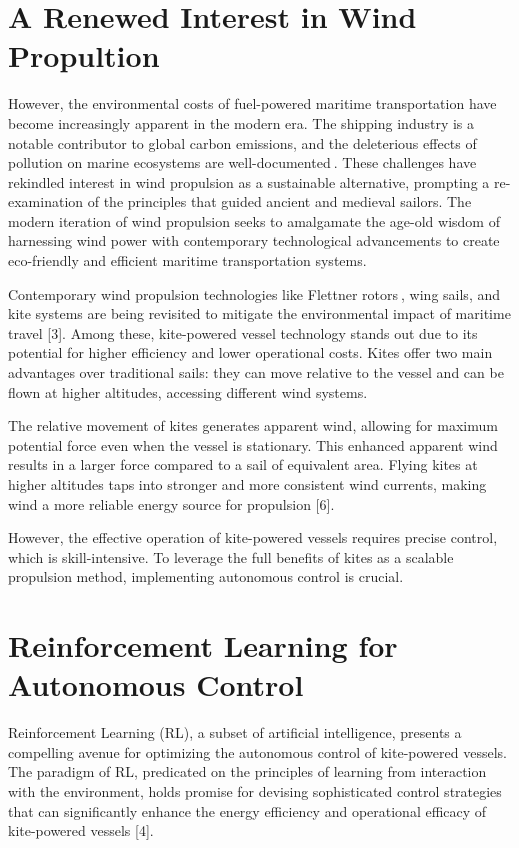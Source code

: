 \section{A Renewed Interest in Wind Propultion}
However, the environmental costs of fuel-powered maritime transportation have become increasingly apparent in the modern era. The shipping industry is a notable contributor to global carbon emissions, and the deleterious effects of pollution on marine ecosystems are well-documented$~$\cite{corbett2007mortality}. These challenges have rekindled interest in wind propulsion as a sustainable alternative, prompting a re-examination of the principles that guided ancient and medieval sailors. The modern iteration of wind propulsion seeks to amalgamate the age-old wisdom of harnessing wind power with contemporary technological advancements to create eco-friendly and efficient maritime transportation systems.

Contemporary wind propulsion technologies like Flettner rotors$~$\cite{vahs2019retrofitting}, wing sails, and kite systems are being revisited to mitigate the environmental impact of maritime travel [3]. Among these, kite-powered vessel technology stands out due to its potential for higher efficiency and lower operational costs. Kites offer two main advantages over traditional sails: they can move relative to the vessel and can be flown at higher altitudes, accessing different wind systems.

The relative movement of kites generates apparent wind, allowing for maximum potential force even when the vessel is stationary. This enhanced apparent wind results in a larger force compared to a sail of equivalent area. Flying kites at higher altitudes taps into stronger and more consistent wind currents, making wind a more reliable energy source for propulsion [6].

However, the effective operation of kite-powered vessels requires precise control, which is skill-intensive. To leverage the full benefits of kites as a scalable propulsion method, implementing autonomous control is crucial. 

\section{Reinforcement Learning for Autonomous Control}
Reinforcement Learning (RL), a subset of artificial intelligence, presents a compelling avenue for optimizing the autonomous control of kite-powered vessels. The paradigm of RL, predicated on the principles of learning from interaction with the environment, holds promise for devising sophisticated control strategies that can significantly enhance the energy efficiency and operational efficacy of kite-powered vessels [4].

